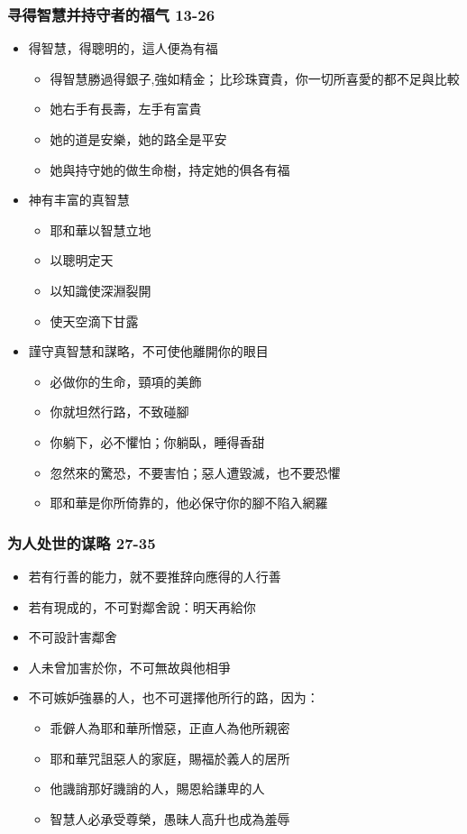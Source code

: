 \subsubsection{寻得智慧并持守者的福气 13-26}
\begin{itemize}
\itemsep-.45em  
\item 得智慧，得聰明的，這人便為有福
\begin{itemize}
\itemsep-.45em  
\item 得智慧勝過得銀子,強如精金； 比珍珠寶貴，你一切所喜愛的都不足與比較
\item 她右手有長壽，左手有富貴
\item 她的道是安樂，她的路全是平安
\item 她與持守她的做生命樹，持定她的俱各有福
\end{itemize}
\item 神有丰富的真智慧
\begin{itemize}
\itemsep-.45em  
\item 耶和華以智慧立地
\item 以聰明定天
\item 以知識使深淵裂開
\item 使天空滴下甘露
\end{itemize}
\item 謹守真智慧和謀略，不可使他離開你的眼目
\begin{itemize}
\itemsep-.45em  
\item 必做你的生命，頸項的美飾
\item 你就坦然行路，不致碰腳
\item 你躺下，必不懼怕；你躺臥，睡得香甜
\item 忽然來的驚恐，不要害怕；惡人遭毀滅，也不要恐懼
\item 耶和華是你所倚靠的，他必保守你的腳不陷入網羅
\end{itemize}
\end{itemize}
\subsubsection{为人处世的谋略 27-35}
\begin{itemize}
\itemsep-.45em  
\item 若有行善的能力，就不要推辞向應得的人行善
\item 若有現成的，不可對鄰舍說：明天再給你
\item 不可設計害鄰舍
\item 人未曾加害於你，不可無故與他相爭
\item 不可嫉妒強暴的人，也不可選擇他所行的路，因为：
\begin{itemize}
\itemsep-.45em  
\item 乖僻人為耶和華所憎惡，正直人為他所親密
\item 耶和華咒詛惡人的家庭，賜福於義人的居所
\item 他譏誚那好譏誚的人，賜恩給謙卑的人
\item 智慧人必承受尊榮，愚昧人高升也成為羞辱
\end{itemize}
\end{itemize}

